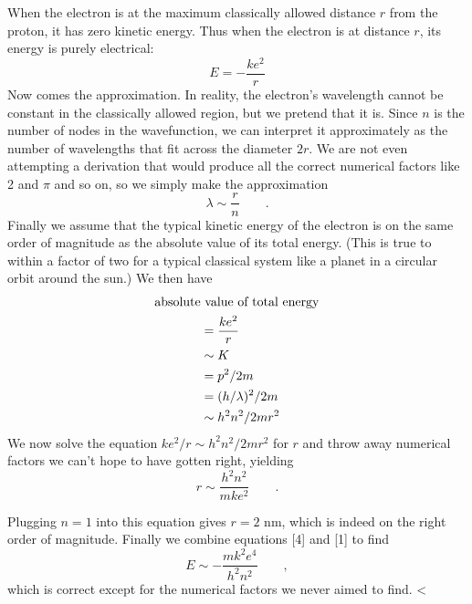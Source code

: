 When the electron is at the maximum classically allowed distance $r$ from the proton, it
has zero kinetic energy.
Thus when the
electron is at distance $r$, its energy is purely electrical:
\begin{equation}
  E    = -\frac{ke^2}{r}           
\end{equation}
Now comes the approximation. In reality, the electron's
wavelength cannot be constant in the classically allowed
region, but we pretend that it is. Since $n$ is the number
of nodes in the wavefunction, we can interpret it approximately
as the number of wavelengths that fit across the diameter
$2r$. We are not even attempting a derivation that would
produce all the correct numerical factors like 2 and $\pi $
and so on, so we simply make the approximation
\begin{equation}
        \lambda \sim \frac{r}{n}      \qquad   .        
\end{equation}
Finally we assume that the typical kinetic energy of the
electron is on the same order of magnitude as the absolute
value of its total energy. (This is true to within a factor
of two for a typical classical system like a planet in a
circular orbit around the sun.) We then have
\begin{subequations}
\renewcommand{\theequation}{\theparentequation}
\begin{align}
        \text{absolute}&\text{ value of total energy} \\
        &= \frac{ke^2}{r} \notag \\
        &\sim K \notag \\ 
        &= p^2/2m \notag \\
        &= (h/\lambda)^2/2m \notag \\
        &\sim h^2n^2/2mr^2 \notag
\end{align}
\end{subequations}
We now solve the equation $ke^2/r \sim h^2n^2 / 2mr^2$ for $r$
and throw away numerical factors we can't hope to have
gotten right, yielding
\begin{equation}
        r \sim \frac{h^2n^2}{mke^2} \qquad .
\end{equation}

Plugging $n=1$ into this equation gives $r=2$ nm, which is
indeed on the right order of magnitude. Finally we combine
equations [4] and [1] to find
\begin{equation*}
        E \sim -\frac{mk^2e^4}{h^2n^2} \qquad ,
\end{equation*}
which is correct except for the numerical factors we
never aimed to find.\label{end-approx-hydrogen-energies}
<%

